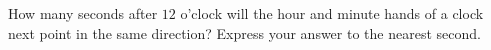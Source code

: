 How many seconds after $12$ o'clock will the hour and minute hands of a clock next point in the same direction? Express your answer to the nearest second.

